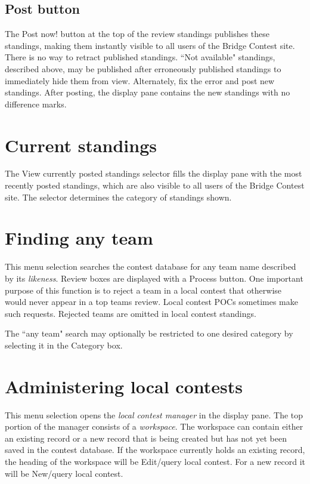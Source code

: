 \documentclass[11pt,letterpaper]{refart}
\def\ui#1{\textsf{#1}}
\begin{document}
\subsection{Post button}
The \ui{Post now!} button at the top of the review standings publishes
these standings, making them instantly visible to all users of the
Bridge Contest site. There is no way to retract published standings.
``Not available" standings, described above, may be published after
erroneously published standings to immediately hide them from
view. Alternately, fix the error and post new standings. After
posting, the display pane contains the new standings with no
difference marks.

\section{Current standings}
The \ui{View currently posted standings} selector fills the display
pane with the most recently posted standings, which are also visible
to all users of the Bridge Contest site. The selector determines the
category of standings shown.

\section{Finding any team}
This menu selection searches the contest database for any team name
described by its \emph{likeness}. Review boxes are displayed with a
\ui{Process} button. One important purpose of this function is to
reject a team in a local contest that otherwise would never appear
in a top teams review. Local contest POCs sometimes make such
requests. Rejected teams are omitted in local contest standings.

The ``any team" search may optionally be restricted to one desired
category by selecting it in the \ui{Category} box.

\section{Administering local contests}
This menu selection opens the \emph{local contest manager} in the
display pane. The top portion of the manager consists of a
\emph{workspace}. The workspace can contain either an existing record
or a new record that is being created but has not yet been saved in
the contest database. If the workspace currently holds an existing
record, the heading of the workspace will be \ui{Edit/query local
  contest}. For a new record it will be \ui{New/query local contest}.
\end{document}

